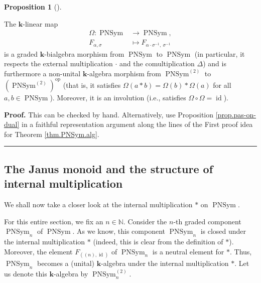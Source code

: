\documentclass[numbers=enddot,12pt,final,onecolumn,notitlepage]{scrartcl}%
\theoremstyle{definition}
\newtheorem{prop}[theo]{Proposition}
\newenvironment{proposition}[1][]
{\begin{prop}[#1]\begin{leftbar}}
{\end{leftbar}\end{prop}}
\newenvironment{proof}[1][Proof]{\noindent\textbf{#1.} }{\ \rule{0.5em}{0.5em}}
\begin{document}
\begin{proposition}
\label{prop.PNSym.self-opp}The $\mathbf{k}$-linear map%
\begin{align*}
\Omega:\operatorname*{PNSym}  &  \rightarrow\operatorname*{PNSym},\\
F_{\alpha,\sigma}  &  \mapsto F_{\alpha\cdot\sigma^{-1},\ \sigma^{-1}}%
\end{align*}
is a graded $\mathbf{k}$-bialgebra morphism from $\operatorname*{PNSym}$ to
$\operatorname*{PNSym}$ (in particular, it respects the external
multiplication $\cdot$ and the comultiplication $\Delta$) and is furthermore a
non-unital $\mathbf{k}$-algebra morphism from $\operatorname*{PNSym}%
\nolimits^{\left(  2\right)  }$ to $\left(  \operatorname*{PNSym}%
\nolimits^{\left(  2\right)  }\right)  ^{\operatorname*{op}}$ (that is, it
satisfies $\Omega\left(  a\ast b\right)  =\Omega\left(  b\right)  \ast
\Omega\left(  a\right)  $ for all $a,b\in\operatorname*{PNSym}$). Moreover, it
is an involution (i.e., satisfies $\Omega\circ\Omega=\operatorname*{id}$).
\end{proposition}

\begin{proof}
This can be checked by hand. Alternatively, use Proposition
\ref{prop.pas-on-dual} in a faithful representation argument along the lines
of the First proof idea for Theorem \ref{thm.PNSym.alg}.
\end{proof}

\subsection{The Janus monoid and the structure of internal multiplication}

We shall now take a closer look at the internal multiplication $\ast$ on
$\operatorname*{PNSym}$.

For this entire section, we fix an $n\in\mathbb{N}$. Consider the $n$-th
graded component $\operatorname*{PNSym}\nolimits_{n}$ of
$\operatorname*{PNSym}$. As we know, this component $\operatorname*{PNSym}%
\nolimits_{n}$ is closed under the internal multiplication $\ast$ (indeed,
this is clear from the definition of $\ast$). Moreover, the element
$F_{\left(  \left(  n\right)  ,\operatorname*{id}\right)  }$ of
$\operatorname*{PNSym}\nolimits_{n}$ is a neutral element for $\ast$. Thus,
$\operatorname*{PNSym}\nolimits_{n}$ becomes a (unital) $\mathbf{k}$-algebra
under the internal multiplication $\ast$. Let us denote this $\mathbf{k}%
$-algebra by $\operatorname*{PNSym}\nolimits_{n}^{\left(  2\right)  }$.
\end{document}

